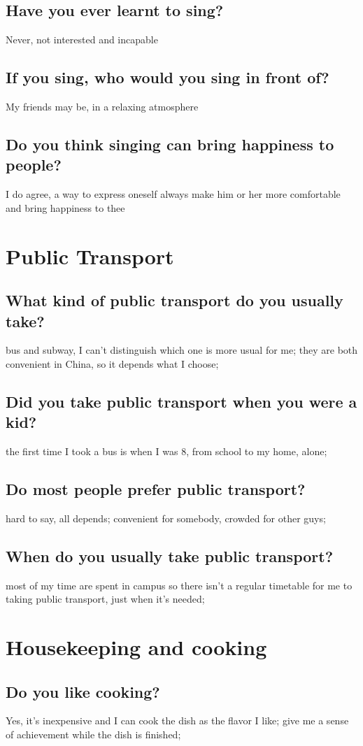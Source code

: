 \documentclass[conference]{IEEEtran}
\begin{document}
\subsection{Have you ever learnt to sing?}
Never, not interested and incapable
\subsection{If you sing, who would you sing in front of?}
My friends may be, in a relaxing atmosphere
\subsection{Do you think singing can bring happiness to people?}
I do agree, a way to express oneself always make him or her more comfortable and
bring happiness to thee

\section{Public Transport}
\subsection{What kind of public transport do you usually take?}
bus and subway, I can't distinguish which one is more usual for me;
they are both convenient in China, so it depends what I choose;
\subsection{Did you take public transport when you were a kid?}
the first time I took a bus is when I was 8, from school to my home, alone;
\subsection{Do most people prefer public transport?}
hard to say, all depends;
convenient for somebody, crowded for other guys;
\subsection{When do you usually take public transport?}
most of my time are spent in campus so there isn't a regular timetable for me
to taking public transport, just when it's needed;

\section{Housekeeping and cooking}
\subsection{Do you like cooking?}
Yes, it's inexpensive and I can cook the dish as the flavor I like;
give me a sense of achievement while the dish is finished;
\end{document}
